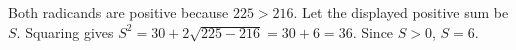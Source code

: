 Both radicands are positive because $225>216$. Let the displayed positive sum be $S$. Squaring gives $S^2=30+2\sqrt{225-216}=30+6=36$. Since $S>0$, $\boxed{S=6}$.
